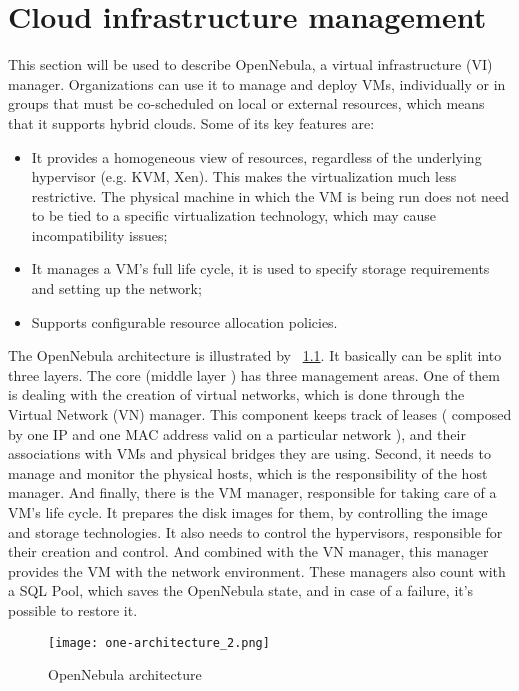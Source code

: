 \chapter{\textbf{Cloud infrastructure management}}


This section will be used to describe OpenNebula, a virtual infrastructure (VI) manager. Organizations can use it to manage and deploy VMs, individually or in groups that must be co-scheduled on local or external resources, which means that it supports hybrid clouds. Some of its key features are:
\begin{itemize}
 \item It provides a homogeneous view of resources, regardless of the underlying hypervisor (e.g. KVM, Xen). This makes the virtualization much less restrictive. The physical machine in which the VM is being run does not need to be tied to a specific virtualization technology, which may cause incompatibility issues;
  \item It manages a VM's full life cycle, it is used to specify storage requirements and setting up the network;
  \item Supports configurable resource allocation policies.
\end{itemize}

The OpenNebula architecture is illustrated by ~\ref{fig:open_arch}. It basically can be split into three layers. The core (middle layer ) has three management areas. One of them is dealing with the creation of virtual networks, which is done through the Virtual Network (VN) manager. This component keeps track of leases ( composed by one IP and one MAC address valid on a particular network ), and their associations with VMs and physical bridges they are using. Second, it needs to manage and monitor the physical hosts, which is the responsibility of the host manager. And finally, there is the VM manager, responsible for taking care of a VM's life cycle. It prepares the disk images for them, by controlling the image and storage technologies. It also needs to control the hypervisors, responsible for their creation and control. And combined with the VN manager, this manager provides the VM with the network environment. These managers also count with a SQL Pool, which saves the OpenNebula state, and in case of a 
failure, it's possible to restore it.

\begin{figure}[ht]
  \centering
 \texttt{[image: one-architecture\_2.png]}
  \caption{OpenNebula architecture}
  \label{fig:open_arch}
\end{figure}

